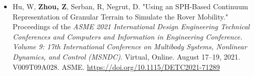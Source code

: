 \begin{footnotesize}
\begin{itemize}[leftmargin=2ex, nosep, noitemsep]
	
	\item {Hu, W, \textbf{Zhou, Z}, Serban, R, Negrut, D. "Using an SPH-Based Continuum Representation of Granular Terrain to Simulate the Rover Mobility." Proceedings of the \textit{ASME 2021 International Design Engineering Technical Conferences and Computers and Information in Engineering Conference. Volume 9: 17th International Conference on Multibody Systems, Nonlinear Dynamics, and Control (MSNDC)}. Virtual, Online. August 17–19, 2021. V009T09A028. ASME. \url{https://doi.org/10.1115/DETC2021-71289}}

\end{itemize}
	
\end{footnotesize}


